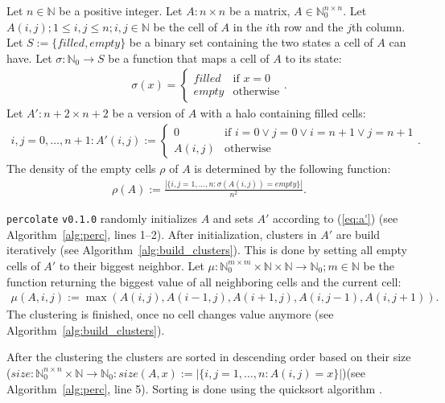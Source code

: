 \documentclass[twoside,11pt]{article}
\def\perc{\texttt{perco\-late}}
\def\v{\texttt{v0.1.0}}
\begin{document}
Let $n \in \mathbb{N}$ be a positive integer.
Let $A: n \times n$ be a matrix,
$A \in \mathbb{N}_{0}^{n \times n}$.
Let $A(i, j); 1 \leq i, j \leq n; i, j \in \mathbb{N}$ be
the cell of $A$ in the $i$th row and the $j$th column.
Let $S := \{filled, empty\}$ be a binary set containing the
two states a cell of $A$ can have.
Let $\sigma: \mathbb{N}_0 \rightarrow S$ be a function that
maps a cell of $A$ to its state:
\begin{align*}
\sigma(x) = \begin{cases}
  filled &\text{if } x = 0 \\
  empty  &\text{otherwise}
\end{cases}.
\end{align*}
Let $A': n+2 \times n+2$ be a version of $A$ with a halo
containing filled cells:
\begin{align}
  \label{eq:a'}
i,j = 0, \dots, n+1: A'(i, j) := \begin{cases}
  0 &\text{if } i=0 \lor j=0 \lor i=n+1 \lor j=n+1 \\
  A(i, j) &\text{otherwise}
\end{cases}.
\end{align}
The density of the empty cells $\rho$ of $A$ is determined
by the following function:
\begin{align*}
\rho(A) := \frac{|\{i,j=1,\dots,n: \sigma(A(i,j)) = empty\}|}{n^2}.
\end{align*}

\perc{} \v{} randomly initializes $A$ and sets $A'$
according to (\ref{eq:a'}) (see Algorithm~\ref{alg:perc},
lines 1--2).
After initialization, clusters in $A'$ are build
iteratively (see Algorithm~\ref{alg:build_clusters}).
This is done by setting all empty cells of $A'$ to their
biggest neighbor.
Let $\mu:\mathbb{N}_0^{m \times m} \times \mathbb{N} \times
\mathbb{N} \rightarrow \mathbb{N}_0; m \in \mathbb{N}$ be
the function returning the biggest value of all neighboring
cells and the current cell:
\begin{align*}
  \mu(A, i, j) := \max(A(i, j), A(i-1, j), A(i+1, j),
                       A(i, j-1), A(i, j+1)).
\end{align*}
The clustering is finished, once no cell changes value
anymore (see Algorithm~\ref{alg:build_clusters}).

After the clustering the clusters are sorted in descending
order based on their size
($size: \mathbb{N}_0^{n \times n} \times \mathbb{N}
\rightarrow \mathbb{N}_0: size(A, x) :=
|\{i,j=1,\dots,n: A(i,j) = x\}|$)(see
Algorithm~\ref{alg:perc}, line 5).
Sorting is done using the quicksort algorithm
\citep[see][]{hoare_1961}.
\end{document}
